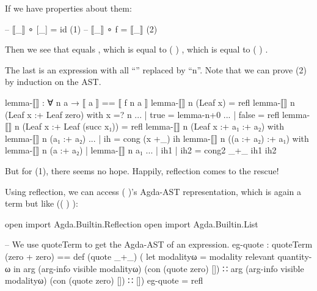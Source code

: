 \documentclass{article}
\begin{document}
If we have properties about them:

\begin{code}
-- ⟦_⟧ ∘ [_] = id     (1)
-- ⟦_⟧ ∘ f = ⟦_⟧      (2)
\end{code}

Then we see that  equals  , which is equal to \AgdaSymbol(  \AgdaFunction{[\AgdaUnderscore{}]}\AgdaSymbol) , which is equal to \AgdaSymbol(    \AgdaFunction{[\AgdaUnderscore{}]}\AgdaSymbol) .

The last is an expression with all ``'' replaced by ``n''. Note that we can prove (2) by induction on the AST.

\begin{code}
lemma-⟦⟧ : ∀ n a →  ⟦ a ⟧ == ⟦ f n a ⟧
lemma-⟦⟧ n (Leaf x) = refl
lemma-⟦⟧ n (Leaf x :+ Leaf zero) with x =? n
... | true = lemma-n+0
... | false = refl
lemma-⟦⟧ n (Leaf x :+ Leaf (succ x₁)) = refl
lemma-⟦⟧ n (Leaf x :+ a₁ :+ a₂) with lemma-⟦⟧ n (a₁ :+ a₂)
... | ih = cong (x +_) ih
lemma-⟦⟧ n ((a :+ a₂) :+ a₁) with lemma-⟦⟧ n (a :+ a₂) | lemma-⟦⟧ n a₁
... | ih1 | ih2 = cong2 _+_ ih1 ih2
\end{code}

But for (1), there seems no hope. Happily, reflection comes to the rescue!

Using reflection, we can access \AgdaSymbol( \AgdaOperator{\AgdaFunction{+}} \AgdaSymbol)'s Agda-AST representation, which is again a term but like \AgdaSymbol(\AgdaSymbol( \AgdaFunction{\AgdaUnderscore{}+\AgdaUnderscore{}}\AgdaSymbol) \AgdaOperator{\AgdaFunction{[}}   \AgdaOperator{\AgdaInductiveConstructor{,}}   \AgdaOperator{\AgdaFunction{]}}\AgdaSymbol):

\begin{code}
open import Agda.Builtin.Reflection
open import Agda.Builtin.List

-- We use quoteTerm to get the Agda-AST of an expression.
eg-quote : quoteTerm (zero + zero) ==
  def (quote _+_)
      ( let modalityω = modality relevant quantity-ω in
        arg (arg-info visible modalityω) (con (quote zero) [])
      ∷ arg (arg-info visible modalityω) (con (quote zero) [])
      ∷ [])
eg-quote = refl
\end{code}
\end{document}
